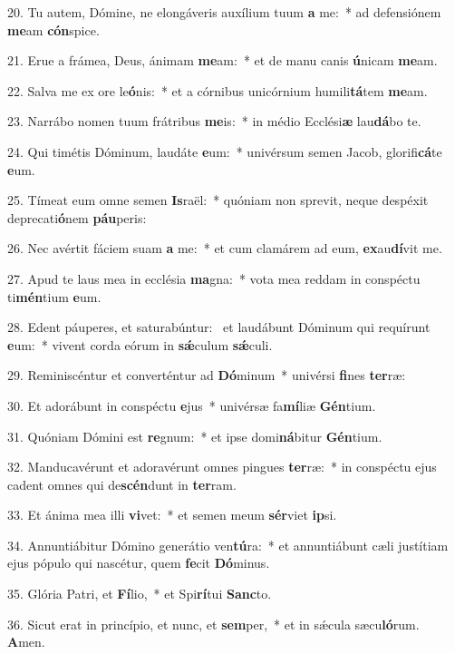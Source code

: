 20. Tu autem, Dómine, ne elongáveris auxílium tuum \textbf{a} me:~*  ad defensiónem \textbf{me}am \textbf{cón}spice.\

21. Erue a frámea, Deus, ánimam \textbf{me}am:~*  et de manu canis \textbf{ú}nicam \textbf{me}am.\

22. Salva me ex ore le\textbf{ó}nis:~*  et a córnibus unicórnium humili\textbf{tá}tem \textbf{me}am.\

23. Narrábo nomen tuum frátribus \textbf{me}is:~*  in médio Ecclési\textbf{æ} lau\textbf{dá}bo te.\

24. Qui timétis Dóminum, laudáte \textbf{e}um:~*  univérsum semen Jacob, glorifi\textbf{cá}te \textbf{e}um.\

25. Tímeat eum omne semen \textbf{Is}raël:~*  quóniam non sprevit, neque despéxit deprecati\textbf{ó}nem \textbf{páu}peris:\

26. Nec avértit fáciem suam \textbf{a} me:~*  et cum clamárem ad eum, \textbf{ex}au\textbf{dí}vit me.\

27. Apud te laus mea in ecclésia \textbf{ma}gna:~*  vota mea reddam in conspéctu ti\textbf{mén}tium \textbf{e}um.\

28. Edent páuperes, et saturabúntur: \dag\  et laudábunt Dóminum qui requírunt \textbf{e}um:~*  vivent corda eórum in \textbf{sǽ}culum \textbf{sǽ}culi.\

29. Reminiscéntur et converténtur ad \textbf{Dó}minum~*  univérsi \textbf{fi}nes \textbf{ter}ræ:\

30. Et adorábunt in conspéctu \textbf{e}jus~*  univérsæ fa\textbf{mí}liæ \textbf{Gén}tium.\

31. Quóniam Dómini est \textbf{re}gnum:~*  et ipse domi\textbf{ná}bitur \textbf{Gén}tium.\

32. Manducavérunt et adoravérunt omnes pingues \textbf{ter}ræ:~*  in conspéctu ejus cadent omnes qui de\textbf{scén}dunt in \textbf{ter}ram.\

33. Et ánima mea illi \textbf{vi}vet:~*  et semen meum \textbf{sér}viet \textbf{ip}si.\

34. Annuntiábitur Dómino generátio ven\textbf{tú}ra:~*  et annuntiábunt cæli justítiam ejus pópulo qui nascétur, quem \textbf{fe}cit \textbf{Dó}minus.\

35. Glória Patri, et \textbf{Fí}lio,~*  et Spi\textbf{rí}tui \textbf{Sanc}to.\

36. Sicut erat in princípio, et nunc, et \textbf{sem}per,~*  et in sǽcula sæcu\textbf{ló}rum. \textbf{A}men.\


